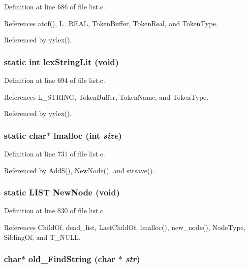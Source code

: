 Definition at line 686 of file list.c.

References atof(), L\_\-REAL, Token\-Buffer, Token\-Real, and Token\-Type.

Referenced by yylex().
\subsubsection{\setlength{\rightskip}{0pt plus 5cm}static int lex\-String\-Lit (void)\hspace{0.3cm}{\tt  [static]}}\label{list_8c_7e3e64d8a728a5815a25108ab11980ae}




Definition at line 694 of file list.c.

References L\_\-STRING, Token\-Buffer, Token\-Name, and Token\-Type.

Referenced by yylex().
\subsubsection{\setlength{\rightskip}{0pt plus 5cm}static char$\ast$ lmalloc (int {\em size})\hspace{0.3cm}{\tt  [static]}}\label{list_8c_0970a28bf64c34bb465120ff6e0ccabb}




Definition at line 731 of file list.c.

Referenced by Add\-S(), New\-Node(), and strsave().
\subsubsection{\setlength{\rightskip}{0pt plus 5cm}static \bf{LIST} New\-Node (void)\hspace{0.3cm}{\tt  [static]}}\label{list_8c_bdaba8a4f6b31bc25f87d5f823b42a6b}




Definition at line 830 of file list.c.

References Child\-Of, dead\_\-list, Last\-Child\-Of, lmalloc(), new\_\-node(), Node\-Type, Sibling\-Of, and T\_\-NULL.
\subsubsection{\setlength{\rightskip}{0pt plus 5cm}char$\ast$ old\_\-Find\-String (char $\ast$ {\em str})}\label{list_8c_4e0e7d8552688931b3a78bc432005db0}





